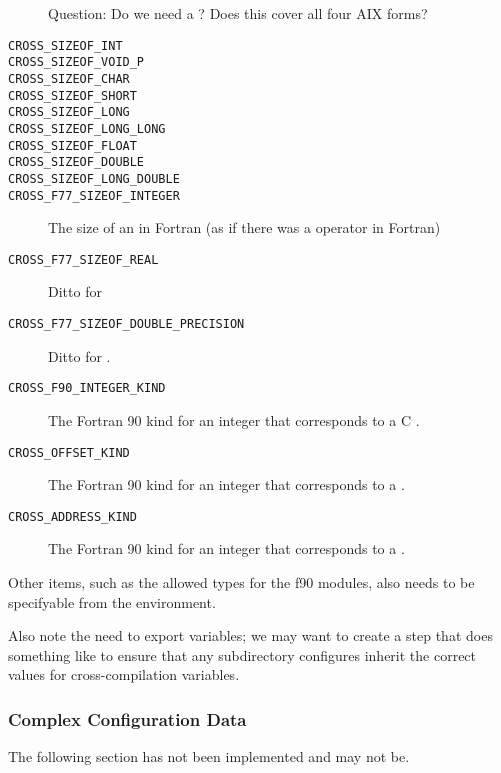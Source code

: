 \documentclass{article}
\begin{document}
\begin{description}
    Question: Do we need a ?  Does this cover all four AIX forms?
\item[\texttt{CROSS_SIZEOF_INT}]
\item[\texttt{CROSS_SIZEOF_VOID_P}]
\item[\texttt{CROSS_SIZEOF_CHAR}]
\item[\texttt{CROSS_SIZEOF_SHORT}]
\item[\texttt{CROSS_SIZEOF_LONG}]
\item[\texttt{CROSS_SIZEOF_LONG_LONG}]
\item[\texttt{CROSS_SIZEOF_FLOAT}]
\item[\texttt{CROSS_SIZEOF_DOUBLE}]
\item[\texttt{CROSS_SIZEOF_LONG_DOUBLE}]
\item[\texttt{CROSS_F77_SIZEOF_INTEGER}]The size of an  in
  Fortran (as if there was a  operator in Fortran)
\item[\texttt{CROSS_F77_SIZEOF_REAL}]Ditto for 
\item[\texttt{CROSS_F77_SIZEOF_DOUBLE_PRECISION}]Ditto for
.
\item[\texttt{CROSS_F90_INTEGER_KIND}]The Fortran 90 kind for an integer that
  corresponds to a C .
\item[\texttt{CROSS_OFFSET_KIND}]The Fortran 90 kind for an integer that
  corresponds to a .
\item[\texttt{CROSS_ADDRESS_KIND}]The Fortran 90 kind for an integer that
  corresponds to a .
\end{description}

Other items, such as the allowed types for the f90 modules, also needs
to be specifyable from the environment.

Also note the need to export variables; we may want to
create a step that does something like  to ensure that any subdirectory configures inherit the
correct values for cross-compilation variables.

\subsubsection{Complex Configuration Data}
The following section has not been implemented and may not be.
\end{document}

